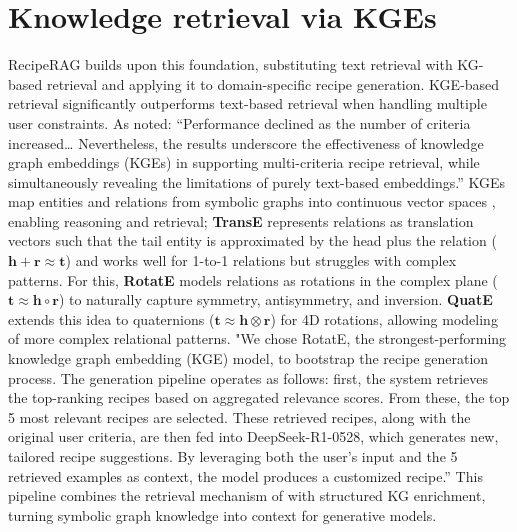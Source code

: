 \documentclass[conference]{IEEEtran}
\begin{document}
\section{Knowledge retrieval via KGEs}
\noindent
RecipeRAG \cite{loesch2025reciperag} builds upon this foundation, substituting text retrieval with KG-based retrieval and applying it to domain-specific recipe generation. \noindent
KGE-based retrieval \cite{loesch2025reciperag} significantly outperforms text-based retrieval when handling multiple user constraints. As noted: “Performance declined as the number of criteria increased… Nevertheless, the results underscore the effectiveness of knowledge graph embeddings (KGEs) in supporting multi-criteria recipe retrieval, while simultaneously revealing the limitations of purely text-based embeddings.” %
KGEs map entities and relations from symbolic graphs into continuous vector spaces \cite{bordes2013translating}, enabling reasoning and retrieval; \textbf{TransE} \cite{bordes2013translating} represents relations as translation vectors such that the tail entity is approximated by the head plus the relation ($\mathbf{h} + \mathbf{r} \approx \mathbf{t}$) and works well for 1-to-1 relations but struggles with complex patterns. For this, \textbf{RotatE} \cite{sun2019rotate} models relations as rotations in the complex plane ($\mathbf{t} \approx \mathbf{h} \circ \mathbf{r}$) to naturally capture symmetry, antisymmetry, and inversion. \textbf{QuatE} \cite{zhang2019quaternion} extends this idea to quaternions ($\mathbf{t} \approx \mathbf{h} \otimes \mathbf{r}$) for 4D rotations, allowing modeling of more complex relational patterns. 
"We chose RotatE, the strongest-performing knowledge graph embedding (KGE) model, to bootstrap the recipe generation process. The generation pipeline operates as follows: first, the system retrieves the top-ranking recipes based on aggregated relevance scores. From these, the top 5 most relevant recipes are selected. These retrieved recipes, along with the original user criteria, are then fed into DeepSeek-R1-0528, which generates new, tailored recipe suggestions. By leveraging both the user’s input and the 5 retrieved examples as context, the model produces a customized recipe.” This pipeline combines the retrieval mechanism of \cite{lewis2020rag} with structured KG enrichment, turning symbolic graph knowledge into context for generative models. 
\end{document}
